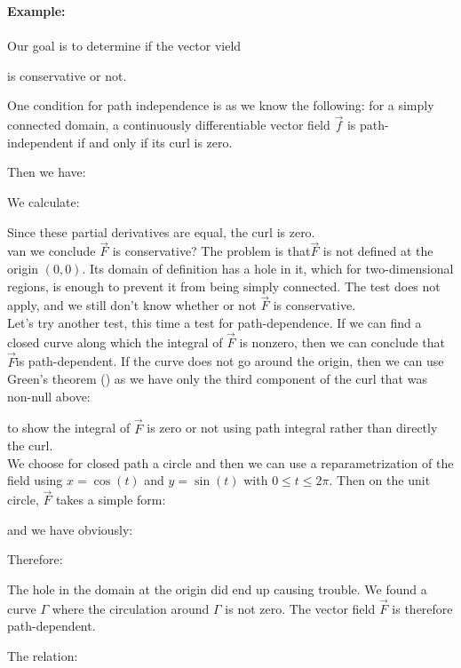 	\begin{tcolorbox}[colframe=black,colback=white,sharp corners]
	\textbf{{\Large {}}Example:}\\\\
	Our goal is to determine if the vector vield
	
	is conservative or not.

	One condition for path independence is as we know the following: for a simply connected domain, a continuously differentiable vector field $\vec{f}$ is path-independent if and only if its curl is zero.
	
	Then we have:
	
	We calculate:
	
	Since these partial derivatives are equal, the curl is zero.\\

	van we conclude $\vec{F}$ is conservative? The problem is that$\vec{F}$ is not defined at the origin $(0,0)$. Its domain of definition has a hole in it, which for two-dimensional regions, is enough to prevent it from being simply connected. The test does not apply, and we still don't know whether or not $\vec{F}$ is conservative.\\
	
	Let's try another test, this time a test for path-dependence. If we can find a closed curve along which the integral of $\vec{F}$ is nonzero, then we can conclude that $\vec{F}$is path-dependent. If the curve does not go around the origin, then we can use Green's theorem () as we have only the third component of the curl that was non-null above:
	
	to show the integral of $\vec{F}$ is zero or not using path integral rather than directly the curl.\\
	
	We choose for closed path a circle and then we can use a reparametrization of the field using $x= \cos(t)$ and $y=\sin(t)$ with $0\leq t\leq 2\pi$. Then on the unit circle, $\vec{F}$ takes a simple form:
	\end{tcolorbox}
	
	\begin{tcolorbox}[colframe=black,colback=white,sharp corners]
	
	and we have obviously:
	
	Therefore:
	
	The hole in the domain at the origin did end up causing trouble. We found a curve $\Gamma$ where the circulation around $\Gamma$ is not zero. The vector field $\vec{F}$ is therefore path-dependent.
	\end{tcolorbox}
	The relation:
	
